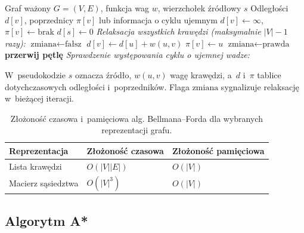 \documentclass[11pt,a4paper,oneside]{report}
\begin{document}
\begin{algorithm}[H]
	\caption{Algorytm Bellmana--Forda}
	\label{alg:bellman-ford}
	\small
	\begin{algorithmic}[1]
		\Require Graf ważony $G=(V,E)$, funkcja wag $w$, wierzchołek źródłowy $s$
		\Ensure Odległości $d[v]$, poprzednicy $\pi[v]$ lub informacja o cyklu ujemnym
		\State $d[v]\gets\infty$, $\pi[v]\gets\text{brak}$
		\EndFor
		\State $d[s]\gets 0$
		\Statex \textit{Relaksacja wszystkich krawędzi (maksymalnie $|V|-1$ razy):}
		  \State $\text{zmiana} \gets \text{fałsz}$
		      \State $d[v]\gets d[u]+w(u,v)$
		      \State $\pi[v]\gets u$
		      \State $\text{zmiana} \gets \text{prawda}$
		    \EndIf
		  \EndFor
		    \State \textbf{przerwij pętlę}
		  \EndIf
		\EndFor
		\Statex \textit{Sprawdzenie występowania cyklu o ujemnej wadze:}
		\State {}
		\EndIf
		\EndFor
		\State {}
	\end{algorithmic}
\end{algorithm}

W~pseudokodzie $s$ oznacza źródło, $w(u,v)$ wagę krawędzi, a~$d$ i~$\pi$ tablice dotychczasowych odległości i~poprzedników. Flaga $\text{zmiana}$ sygnalizuje relaksację w~bieżącej iteracji.

\begin{table}[H]
  \centering
  \small
  \renewcommand{\arraystretch}{1.25}
  \begin{tabularx}{0.9\textwidth}{@{}lXX@{}}
    \toprule
    \textbf{Reprezentacja} & \textbf{Złożoność czasowa} & \textbf{Złożoność pamięciowa} \\
    \midrule
    Lista krawędzi & $O(|V||E|)$ & $O(|V|)$ \\
    Macierz sąsiedztwa & $O(|V|^3)$ & $O(|V|)$ \\
    \bottomrule
  \end{tabularx}
  \caption{Złożoność czasowa i~pamięciowa alg. Bellmana--Forda dla wybranych reprezentacji grafu.}
  \label{tab:zlozonosc-bellmana-forda}
\end{table}

\newpage

\subsection{Algorytm A*}
\end{document}
